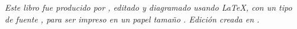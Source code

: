 \cleardoublepage

\null
\vfill
\newpage

\null
\vfill
\thispagestyle{empty}


{\normalsize \it Este libro fue producido por \myauthor, editado y diagramado usando \LaTeX,
con un tipo de fuente \showfont,
para ser impreso en un papel tamaño \imprimirpapersize. Edición creada en \imprimirdata.
\vspace*{4pt}}






